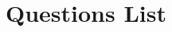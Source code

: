 \chapter{Questions List}

\begin{question}
  \lipsum[1][1-5]
\end{question}

\begin{resolution}
  \lipsum[1][1-6]
\end{resolution}

\begin{question}
  \lipsum[1][1-5]
\end{question}

\begin{resolution}
  \lipsum[1][1-6]
\end{resolution}


